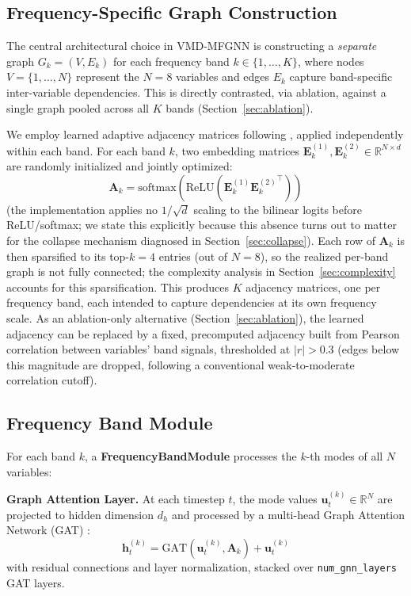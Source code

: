 \documentclass[journal]{IEEEtran}
\begin{document}
\subsection{Frequency-Specific Graph Construction}
\label{sec:graph}

The central architectural choice in VMD-MFGNN is constructing a \emph{separate} graph $G_k = (V, E_k)$ for each frequency band $k \in \{1,\ldots,K\}$, where nodes $V = \{1, \ldots, N\}$ represent the $N=8$ variables and edges $E_k$ capture band-specific inter-variable dependencies. This is directly contrasted, via ablation, against a single graph pooled across all $K$ bands (Section~\ref{sec:ablation}).

We employ learned adaptive adjacency matrices following \citet{Wu2020mtgnn}, applied independently within each band. For each band $k$, two embedding matrices $\mathbf{E}^{(1)}_k, \mathbf{E}^{(2)}_k \in \mathbb{R}^{N \times d}$ are randomly initialized and jointly optimized:
\begin{equation}
\mathbf{A}_k = \text{softmax}\left(\text{ReLU}\left(\mathbf{E}^{(1)}_k {\mathbf{E}^{(2)}_k}^\top\right)\right)
\end{equation}
(the implementation applies no $1/\sqrt{d}$ scaling to the bilinear logits before ReLU/softmax; we state this explicitly because this absence turns out to matter for the collapse mechanism diagnosed in Section~\ref{sec:collapse}). Each row of $\mathbf{A}_k$ is then sparsified to its top-$k=4$ entries (out of $N=8$), so the realized per-band graph is not fully connected; the complexity analysis in Section~\ref{sec:complexity} accounts for this sparsification. This produces $K$ adjacency matrices, one per frequency band, each intended to capture dependencies at its own frequency scale. As an ablation-only alternative (Section~\ref{sec:ablation}), the learned adjacency can be replaced by a fixed, precomputed adjacency built from Pearson correlation between variables' band signals, thresholded at $|r| > 0.3$ (edges below this magnitude are dropped, following a conventional weak-to-moderate correlation cutoff).

\subsection{Frequency Band Module}

For each band $k$, a \textbf{FrequencyBandModule} processes the $k$-th modes of all $N$ variables:

\textbf{Graph Attention Layer.} At each timestep $t$, the mode values $\mathbf{u}^{(k)}_t \in \mathbb{R}^{N}$ are projected to hidden dimension $d_h$ and processed by a multi-head Graph Attention Network (GAT) \citep{Velickovic2018}:
\begin{equation}
\mathbf{h}^{(k)}_{t} = \text{GAT}(\mathbf{u}^{(k)}_{t}, \mathbf{A}_k) + \mathbf{u}^{(k)}_{t}
\end{equation}
with residual connections and layer normalization, stacked over \texttt{num\_gnn\_layers} GAT layers.
\end{document}
